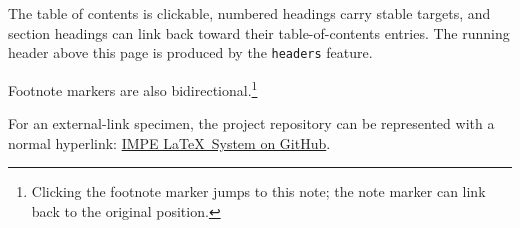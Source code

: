 The table of contents is clickable, numbered headings carry stable targets,
and section headings can link back toward their table-of-contents entries.
The running header above this page is produced by the \texttt{headers}
feature.

Footnote markers are also bidirectional.\footnote{Clicking the footnote marker
jumps to this note; the note marker can link back to the original position.}

For an external-link specimen, the project repository can be represented with
a normal hyperlink:
\href{https://github.com/KelvinYangBK67/IMPE-LaTeX-System}
{IMPE \LaTeX~System on GitHub}.


\printbibliography[
  heading=bibintoc,
  title={References}
]

\printindex



